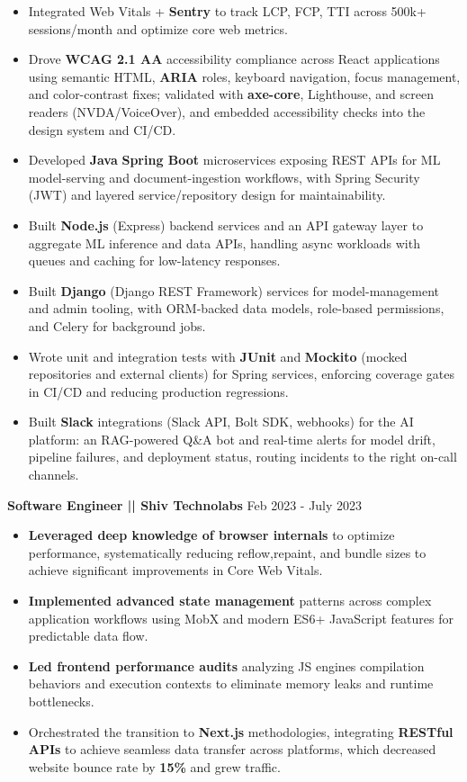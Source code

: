 \documentclass[a4paper]{article}
\begin{document}
\begin{itemize}
\item {Integrated Web Vitals + \textbf{Sentry} to track LCP, FCP, TTI across 500k+ sessions/month and optimize core web metrics.}
\item {Drove \textbf{WCAG 2.1 AA} accessibility compliance across React applications using semantic HTML, \textbf{ARIA} roles, keyboard navigation, focus management, and color-contrast fixes; validated with \textbf{axe-core}, Lighthouse, and screen readers (NVDA/VoiceOver), and embedded accessibility checks into the design system and CI/CD.}
\item {Developed \textbf{Java} \textbf{Spring Boot} microservices exposing REST APIs for ML model-serving and document-ingestion workflows, with Spring Security (JWT) and layered service/repository design for maintainability.}
\item {Built \textbf{Node.js} (Express) backend services and an API gateway layer to aggregate ML inference and data APIs, handling async workloads with queues and caching for low-latency responses.}
\item {Built \textbf{Django} (Django REST Framework) services for model-management and admin tooling, with ORM-backed data models, role-based permissions, and Celery for background jobs.}
\item {Wrote unit and integration tests with \textbf{JUnit} and \textbf{Mockito} (mocked repositories and external clients) for Spring services, enforcing coverage gates in CI/CD and reducing production regressions.}
\item {Built \textbf{Slack} integrations (Slack API, Bolt SDK, webhooks) for the AI platform: an RAG-powered Q\&A bot and real-time alerts for model drift, pipeline failures, and deployment status, routing incidents to the right on-call channels.}
\end{itemize}



\vspace{4pt}
\textbf{Software Engineer || Shiv Technolabs}
\hfill Feb 2023 - July 2023
\begin{itemize}
\vspace{1pt}

\item {\textbf{Leveraged deep knowledge of browser internals} to optimize performance, systematically reducing reflow,repaint, and bundle sizes to achieve significant improvements in Core Web Vitals.}
\item {\textbf{Implemented advanced state management} patterns across complex application workflows using MobX and modern ES6+ JavaScript features for predictable data flow.}
\item {\textbf{Led frontend performance audits} analyzing JS engines compilation behaviors and execution contexts to eliminate memory leaks and runtime bottlenecks.}
\item {Orchestrated the transition to \textbf{Next.js} methodologies, integrating \textbf{RESTful APIs} to achieve seamless data transfer across platforms, which decreased website bounce rate by \textbf{15\%} and grew traffic.}
\end{itemize}
\end{document}
